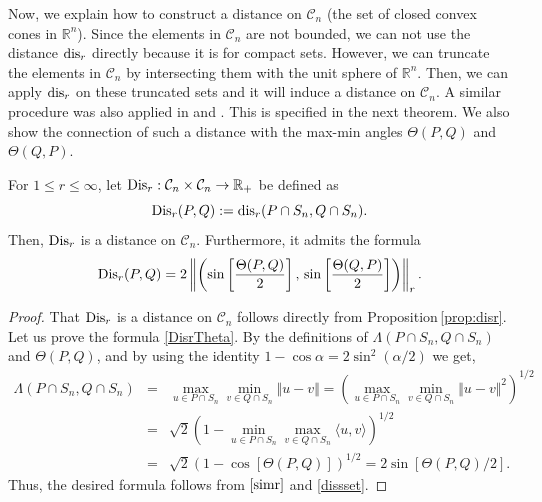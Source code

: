 \documentclass[hidelinks,onefignum,onetabnum]{siamart250211}
\theoremstyle{definition}
\theoremstyle{remark}
\newcommand{\R}{\mathbb R}
\newcommand{\CC}{\mathcal C}
\newcommand{\RR}{\mathbb R}
\newcommand{\Sim}{{\rm Dis}}
\newcommand{\dis}{{\rm dis}}
\newcommand{\Dis}{{\rm Dis}}
\begin{document}
Now, we explain how to construct a distance on $\CC_n$ (the set of closed convex cones in $\R^n$). Since the elements in $\CC_n$ are not bounded, we can not use the distance $\dis_r$ directly because it is for compact sets. However, we can truncate the elements in $\CC_n$ by intersecting them with the unit sphere of $\R^n$. Then, we can apply $\dis_r$ on these truncated sets and it will induce a distance on $\CC_n$. A similar procedure was also applied in \cite{IS2010} and \cite{SeSo1}. This is specified in the next theorem. We also show the connection of such a distance with the max-min angles $\Theta(P,Q)$ and $\Theta(Q,P)$. 
\begin{theorem}\label{th:dist}
For $1\leq r\leq\infty$, let $\Sim_r:\CC_n\times\CC_n\to\RR_+$ be defined as
\begin{equation}\label{simr}
\Sim_r(P,Q):={\rm dis}_r(P\cap S_n,Q\cap S_n).
\end{equation}
Then, $\Sim_r$ is a distance on $\mathcal C_n$. Furthermore, it admits the formula
\begin{equation}\label{DisrTheta}
\Sim_r(P,Q)=2\left\Vert\left(\sin\left[\frac{\Theta(P,Q)}{2}\right],\,\sin\left[\frac{\Theta(Q,P)}{2}\right]\right)\right\Vert_r.
\end{equation}
\end{theorem}
\begin{proof}
That $\Dis_r$ is a distance on $\CC_n$ follows directly from Proposition\,\ref{prop:disr}. Let us prove the formula \eqref{DisrTheta}. By the definitions of $\Lambda(P\cap S_n,Q\cap S_n)$ and $\Theta(P,Q)$, and by using the identity $1-\cos\alpha=2\sin^2(\alpha/2)$ we get,
\begin{eqnarray*}
\Lambda(P\cap S_n,Q\cap S_n)&=&\max_{u\in P\cap S_n}\min_{v\in Q\cap S_n}\Vert u-v\Vert=\left( \max_{u\in P\cap S_n}\min_{v\in Q\cap S_n}\Vert u-v\Vert^2\right)^{1/2}\\
&=&\sqrt{2}\left(1-\min_{u\in P\cap S_n}\max_{v\in Q\cap S_n}\langle u,v\rangle\right)^{1/2}\\
&=&\sqrt{2}\left(1-\cos[\Theta(P,Q)]\right)^{1/2}=2\sin[\Theta(P,Q)/2].
\end{eqnarray*}
Thus, the desired formula follows from $\eqref{simr}$ and \eqref{dissset}.
\end{proof}
\end{document}
